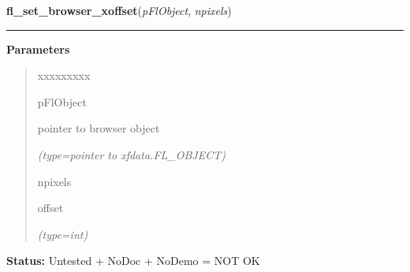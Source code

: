 \hspace{.8\funcindent}\begin{boxedminipage}{\funcwidth}

    \raggedright \textbf{fl\_set\_browser\_xoffset}(\textit{pFlObject}, \textit{npixels})

    \vspace{-1.5ex}

    \rule{\textwidth}{0.5\fboxrule}
\setlength{\parskip}{2ex}
\setlength{\parskip}{1ex}
      \textbf{Parameters}
      \vspace{-1ex}

      \begin{quote}
        \begin{Ventry}{xxxxxxxxx}

          \item[pFlObject]

          pointer to browser object

            {\it (type=pointer to xfdata.FL\_OBJECT)}

          \item[npixels]

          offset

            {\it (type=int)}

        \end{Ventry}

      \end{quote}

\textbf{Status:} Untested + NoDoc + NoDemo = NOT OK



    \end{boxedminipage}

    \label{xformslib:flbrowser:fl_set_browser_rel_xoffset}

    \vspace{0.5ex}

